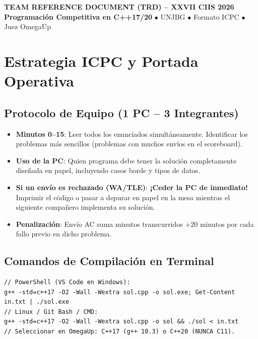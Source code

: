 \documentclass[9pt,twocolumn,a4paper]{extarticle}
\begin{document}
\begin{center}
    {\large \textbf{TEAM REFERENCE DOCUMENT (TRD) -- XXVII CIIS 2026}} \\
    \vspace{1pt}
    {\scriptsize \textbf{Programación Competitiva en C++17/20} $\bullet$ UNJBG $\bullet$ Formato ICPC $\bullet$ Juez OmegaUp}
\end{center}
\vspace{-6pt}

\section{Estrategia ICPC y Portada Operativa}
\subsection{Protocolo de Equipo (1 PC -- 3 Integrantes)}
\begin{itemize}
    \setlength{\itemsep}{0pt}
    \item \textbf{Minutos 0--15}: Leer todos los enunciados simultáneamente. Identificar los problemas más sencillos (problemas con muchos envíos en el scoreboard).
    \item \textbf{Uso de la PC}: Quien programa debe tener la solución completamente diseñada en papel, incluyendo casos borde y tipos de datos.
    \item \textbf{Si un envío es rechazado (WA/TLE)}: \textbf{¡Ceder la PC de inmediato!} Imprimir el código o pasar a depurar en papel en la mesa mientras el siguiente compañero implementa su solución.
    \item \textbf{Penalización}: Envío AC suma minutos transcurridos $+ 20$ minutos por cada fallo previo en dicho problema.
\end{itemize}

\subsection{Comandos de Compilación en Terminal}
\begin{lstlisting}
// PowerShell (VS Code en Windows):
g++ -std=c++17 -O2 -Wall -Wextra sol.cpp -o sol.exe; Get-Content in.txt | ./sol.exe
// Linux / Git Bash / CMD:
g++ -std=c++17 -O2 -Wall -Wextra sol.cpp -o sol && ./sol < in.txt
// Seleccionar en OmegaUp: C++17 (g++ 10.3) o C++20 (NUNCA C11).
\end{lstlisting}
\end{document}

